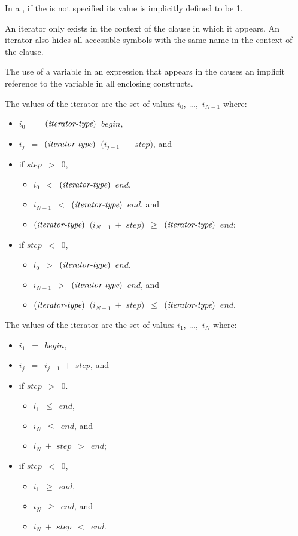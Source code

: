 In a , if the  is not specified its value is
implicitly defined to be 1.

An iterator only exists in the context of the clause in which it appears. An
iterator also hides all accessible symbols with the same name in the context of
the clause.

The use of a variable in an expression that appears in the
 causes an implicit reference to the variable in all
enclosing constructs.

\begin{ccppspecific}
The values of the iterator are the set of values $i_{0}$,~\ldots,~$i_{N-1}$ where:
\begin{itemize}
\item $i_{0}$~$=$~$(\plc{iterator-type})$~$begin$, 
\item $i_{j}$~$=$~$(\plc{iterator-type})$~$(i_{j-1}$~$+$~$step)$, and
\item  if $step$~$>$~$0$,
\begin{itemize}
\item $i_{0}$~$<$~$(\plc{iterator-type})$~$end$,
\item $i_{N-1}$~$<$~$(\plc{iterator-type})$~$end$, and 
\item $(\plc{iterator-type})$~$(i_{N-1}$~$+$~$step)$~$\geq$~$(\plc{iterator-type})$~$end$;
\end{itemize}
\item if $step$~$<$~$0$,
\begin{itemize}
\item $i_{0}$~$>$~$(\plc{iterator-type})$~$end$,
\item $i_{N-1}$~$>$~$(\plc{iterator-type})$~$end$, and 
\item $(\plc{iterator-type})$~$(i_{N-1}$~$+$~$step)$~$\leq$~$(\plc{iterator-type})$~$end$.
\end{itemize}
\end{itemize}
\end{ccppspecific}

\begin{fortranspecific}
The values of the iterator are the set of values $i_{1}$,~\ldots,~$i_{N}$ where:
\begin{itemize}
\item $i_{1}$~$=$~$begin$,  
\item $i_{j}$~$=$~$i_{j-1}$~$+$~$step$, and
\item if $step$~$>$~$0$.
\begin{itemize}
\item $i_{1}$~$\leq$~$end$,
\item $i_{N}$~$\leq$~$end$, and 
\item $i_{N}$~$+$~$step$~$>$~$end$;
\end{itemize}
\item if $step$~$<$~$0$,
\begin{itemize}
\item $i_{1}$~$\geq$~$end$,
\item $i_{N}$~$\geq$~$end$, and 
\item $i_{N}$~$+$~$step$~$<$~$end$.
\end{itemize}
\end{itemize}
\end{fortranspecific}

